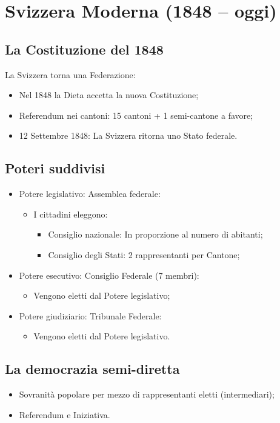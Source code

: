 \documentclass{article}
\begin{document}
\newpage
\section{Svizzera Moderna (1848 – oggi)}

\subsection{La Costituzione del 1848}
La Svizzera torna una Federazione:
\begin{itemize}
    \item Nel 1848 la Dieta accetta la nuova Costituzione;
    \item Referendum nei cantoni: 15 cantoni + 1 semi-cantone a favore;
    \item 12 Settembre 1848: La Svizzera ritorna uno Stato federale.
\end{itemize}

\subsection{Poteri suddivisi}
\begin{itemize}
    \item Potere legislativo: Assemblea federale:
        \begin{itemize}
            \item I cittadini eleggono:
            \begin{itemize}
                \item Consiglio nazionale: In proporzione al numero di abitanti;
                \item Consiglio degli Stati: 2 rappresentanti per Cantone;
            \end{itemize}
        \end{itemize}
    \item Potere esecutivo: Consiglio Federale (7 membri):
        \begin{itemize}
            \item Vengono eletti dal Potere legislativo;
        \end{itemize}
    \item Potere giudiziario: Tribunale Federale:
        \begin{itemize}
            \item Vengono eletti dal Potere legislativo.
        \end{itemize}
\end{itemize}

\subsection{La democrazia semi-diretta}
\begin{itemize}
    \item Sovranità popolare per mezzo di rappresentanti eletti (intermediari);
    \item Referendum e Iniziativa.
\end{itemize}
\end{document}
